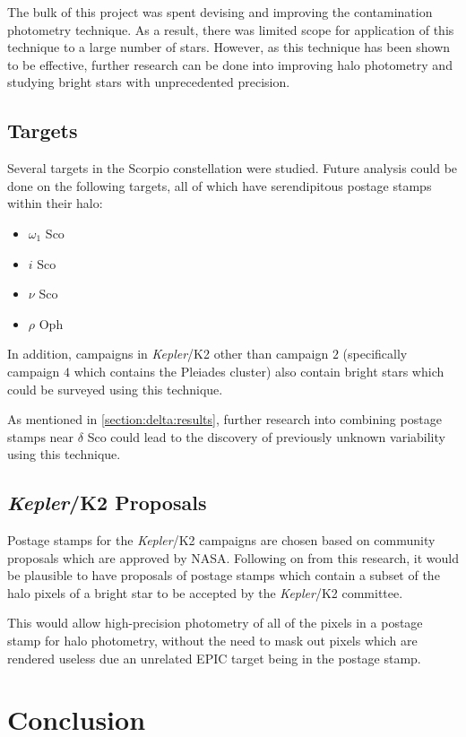 \documentclass{book}
\begin{document}
The bulk of this project was spent devising and improving the contamination
photometry technique. As a result, there was limited scope for application of
this technique to a large number of stars. However, as this technique has been
shown to be effective, further research can be done into improving halo
photometry and studying bright stars with unprecedented precision.

\subsection{Targets}

Several targets in the Scorpio constellation were studied. Future analysis could
be done on the following targets, all of which have serendipitous postage stamps
within their halo:

\begin{itemize}
	\item $\omega_{1}$ Sco
	\item $i$ Sco
	\item $\nu$ Sco
	\item $\rho$ Oph
\end{itemize}

In addition, campaigns in \textit{Kepler}/K2 other than campaign $2$ (specifically
campaign $4$ which contains the Pleiades cluster) also contain bright stars which
could be surveyed using this technique.

As mentioned in \autoref{section:delta:results}, further research into combining
postage stamps near $\delta$ Sco could lead to the discovery of previously unknown
variability using this technique.

\subsection{\textit{Kepler}/K2 Proposals}

Postage stamps for the \textit{Kepler}/K2 campaigns are chosen based on
community proposals which are approved by NASA. Following on from this research,
it would be plausible to have proposals of postage stamps which contain a subset
of the halo pixels of a bright star to be accepted by the \textit{Kepler}/K2
committee.

This would allow high-precision photometry of all of the pixels in a postage
stamp for halo photometry, without the need to mask out pixels which are
rendered useless due an unrelated EPIC target being in the postage stamp.

\section{Conclusion}
\end{document}
